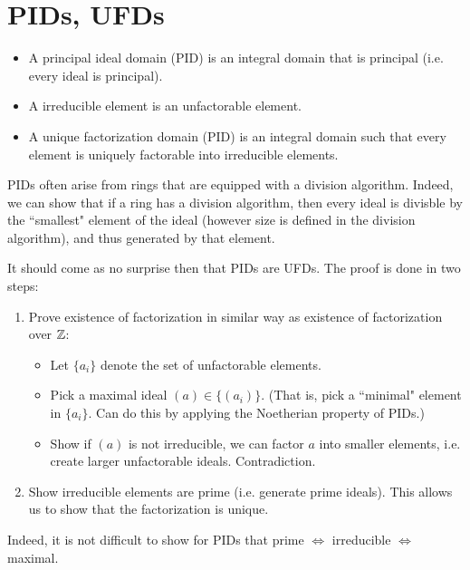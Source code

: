 \section{PIDs, UFDs}
\begin{itemize}
    \item A principal ideal domain (PID) is an integral domain that is principal (i.e. every ideal is principal).
    \item A irreducible element is an unfactorable element.
    \item A unique factorization domain (PID) is an integral domain such that every element is uniquely factorable into irreducible elements.
\end{itemize}

PIDs often arise from rings that are equipped with a division algorithm. Indeed, we can show that if a ring has a division algorithm, then every ideal is divisble by the ``smallest" element of the ideal (however size is defined in the division algorithm), and thus generated by that element.

It should come as no surprise then that PIDs are UFDs. The proof is done in two steps:
\begin{enumerate}
    \item Prove existence of factorization in similar way as existence of factorization over ${\mathbb Z}$:
        \begin{itemize}
            \item Let $\{a_i\}$ denote the set of unfactorable elements.
            \item Pick a maximal ideal $(a) \in \{(a_i)\}$. (That is, pick a ``minimal" element in $\{a_i\}$. Can do this by applying the Noetherian property of PIDs.)
            \item Show if $(a)$ is not irreducible, we can factor $a$ into smaller elements, i.e. create larger unfactorable ideals. Contradiction.
        \end{itemize}
    \item Show irreducible elements are prime (i.e. generate prime ideals). This allows us to show that the factorization is unique.
\end{enumerate}

Indeed, it is not difficult to show for PIDs that prime $\iff$ irreducible $\iff$ maximal. 
